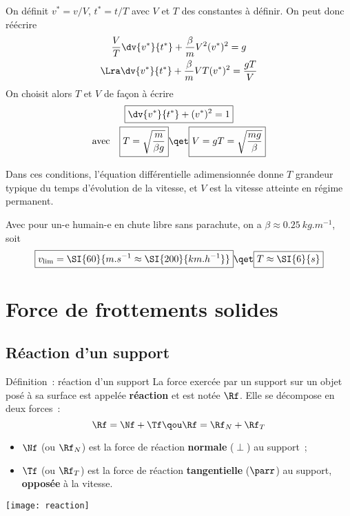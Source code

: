 \documentclass[../main/main.tex]{subfiles}
\begin{document}
On définit $v^* = v/V$, $t^* = t/T$ avec $V$ et $T$ des constantes à définir. On
peut donc réécrire
\begin{gather*}
    \frac{V}{T} \dv{v^*}{t^*} + \frac{\beta}{m}V^2(v^*)^2 = g
    \\\Lra
    \dv{v^*}{t^*} + \frac{\beta}{m}VT(v^*)^2 = \frac{gT}{V}
\end{gather*}
On choisit alors $T$ et $V$ de façon à écrire
\begin{gather*}
    \boxed{\dv{v^*}{t^*} + (v^*)^2 = 1}\\
    \text{avec}\quad
    \boxed{T = \sqrt{\frac{m}{\beta g}}}
    \qet
    \boxed{V = gT = \sqrt{\frac{mg}{\beta}}}
\end{gather*}

Dans ces conditions, l'équation différentielle adimensionnée donne $T$ grandeur
typique du temps d'évolution de la vitesse, et $V$ est la vitesse atteinte en
régime permanent.

Avec pour un-e humain-e en chute libre sans parachute, on a
$\beta \approx \SI{0.25}{kg.m^{-1}}$, soit
\[
    \boxed{v_{\lim} = \SI{60}{m.s^{-1} \approx \SI{200}{km.h^{-1}}}}
    \qet
    \boxed{T \approx \SI{6}{s}}
\]

\section{Force de frottements solides}
\subsection{Réaction d'un support}

\begin{tdefi}{Définition~: réaction d'un support}
    La force exercée par un support sur un objet posé à sa surface est appelée
    \textbf{réaction} et est notée $\Rf$. Elle se décompose en deux forces~:
    \[
        \Rf = \Nf + \Tf
        \qou
        \Rf = \Rf_N + \Rf_T
    \]
    \begin{itemize}
        \item $\Nf$ (ou $\Rf_N$) est la force de réaction \textbf{normale}
            ($\perp$) au support~;
        \item $\Tf$ (ou $\Rf_T$) est la force de réaction \textbf{tangentielle}
            ($\parr$) au support, \textbf{opposée} à la vitesse.
    \end{itemize}
    \begin{center}
        \texttt{[image: reaction]}
    \end{center}
\end{tdefi}
\end{document}
